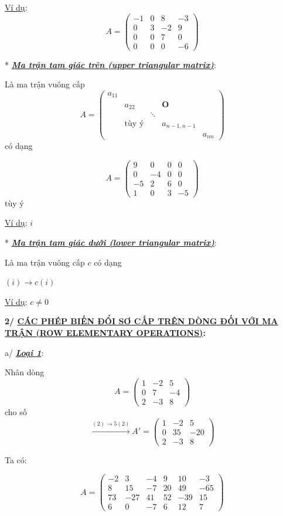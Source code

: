 \documentclass[12pt,a4paper]{article}
\let\ul\uline
\begin{document}
\ul{Ví dụ}: $$A = \begin{pmatrix} -1 & 0 & 8 & -3 \\ 0 & 3 & -2 & 9 \\ 0 & 0 & 7 & 0 \\ 0 & 0 & 0 & -6 \end{pmatrix}$$

* \emph{\textbf{\ul{Ma trận tam giác trên (upper triangular matrix)}}}:

Là ma trận vuông cấp $$A = \begin{pmatrix} a_{11} & & & & \\ & a_{22} & & \mathbf{O} & \\ & & \ddots & & \\ & \text{tùy ý} & & a_{n-1, n-1} & \\ & & & & a_{nn} \end{pmatrix}$$ có dạng

$$A = \begin{pmatrix} 9 & 0 & 0 & 0 \\ 0 & -4 & 0 & 0 \\ -5 & 2 & 6 & 0 \\ 1 & 0 & 3 & -5 \end{pmatrix}$$ tùy ý

\ul{Ví dụ}: $i$

* \emph{\textbf{\ul{Ma trận tam giác dưới (lower triangular matrix)}}}:

Là ma trận vuông cấp $c$ có dạng

$(i) \rightarrow c(i)$

\ul{Ví dụ}: $c \neq 0$

\textbf{2/ \ul{CÁC PHÉP BIẾN ĐỔI SƠ CẤP TRÊN DÒNG ĐỐI VỚI MA TRẬN (ROW
ELEMENTARY OPERATIONS)}:}

a/ \emph{\textbf{\ul{Loại 1}}}:

Nhân dòng $$A = \begin{pmatrix} 1 & -2 & 5 \\ 0 & 7 & -4 \\ 2 & -3 & 8 \end{pmatrix}$$ cho số
$$\xrightarrow{(2) \rightarrow 5(2)} A' = \begin{pmatrix} 1 & -2 & 5 \\ 0 & 35 & -20 \\ 2 & -3 & 8 \end{pmatrix}$$

Ta có:

$$A = \begin{pmatrix} -2 & 3 & -4 & 9 & 10 & -3 \\ 8 & 15 & -7 & 20 & 49 & -65 \\ 73 & -27 & 41 & 52 & -39 & 15 \\ 6 & 0 & -7 & 6 & 12 & 7 \end{pmatrix}$$
\end{document}
